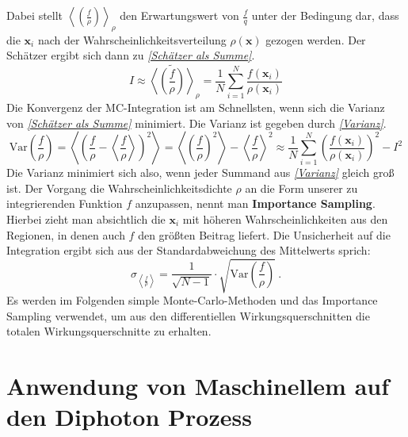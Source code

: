 Dabei stellt $\left\langle \left(\frac{f}{\rho}\right) \right\rangle_{\rho}$  den Erwartungswert von $\frac{f}{q}$ unter der Bedingung dar, dass die $\mathbf{x}_i$ nach der Wahrscheinlichkeitsverteilung $\rho(\mathbf{x})$ gezogen werden. Der Schätzer ergibt sich dann zu \textit{\autoref{Schätzer als Summe}}.
\begin{equation}
I \approx \tilde{\left\langle \left(\frac{f}{\rho}\right) \right\rangle}_{\rho}  = \frac{1}{N}\sum_{i=1}^{N}\frac{f(\mathbf{x}_i)}{\rho(\mathbf{x}_i)}
\label{Schätzer als Summe}
\end{equation}
Die Konvergenz der MC-Integration ist am Schnellsten, wenn sich die Varianz von \textit{\autoref{Schätzer als Summe}} minimiert. Die Varianz ist gegeben durch \textit{\autoref{Varianz}}.
\begin{equation}
\text{Var}\left(\frac{f}{\rho}\right) = \left\langle\left(\frac{f}{\rho} - \left\langle \frac{f}{\rho}\right\rangle \right)^2 \right\rangle = \left\langle \left(\frac{f}{\rho}\right)^2 \right\rangle - \left\langle\frac{f}{\rho} \right\rangle^2 \approx \frac{1}{N} \sum_{i=1}^{N}\left(\frac{f(\mathbf{x}_i)}{\rho(\mathbf{x}_i)}\right)^2 - I^2
\label{Varianz}
\end{equation}
Die Varianz minimiert sich also, wenn jeder Summand aus \textit{\autoref{Varianz}} gleich groß ist. Der Vorgang die Wahrscheinlichkeitsdichte $\rho$ an die Form unserer zu integrierenden Funktion $f$ anzupassen, nennt man \textbf{Importance Sampling}. Hierbei zieht man absichtlich die $\mathbf{x}_i$ mit höheren Wahrscheinlichkeiten aus den Regionen, in denen auch $f$ den größten Beitrag liefert. Die Unsicherheit auf die Integration ergibt sich aus der Standardabweichung des Mittelwerts sprich:
\begin{equation}
\sigma_{\left\langle \frac{f}{\rho}\right\rangle} = \frac{1}{\sqrt{N-1}} \cdot \sqrt{\text{Var}\left(\frac{f}{\rho}\right)}~.
\label{uncertainty-mc}
\end{equation}
Es werden im Folgenden simple Monte-Carlo-Methoden und das Importance Sampling verwendet, um aus den differentiellen Wirkungsquerschnitten die totalen Wirkungsquerschnitte zu erhalten.   
\chapter{Anwendung von Maschinellem auf den Diphoton Prozess}
\label{4}
